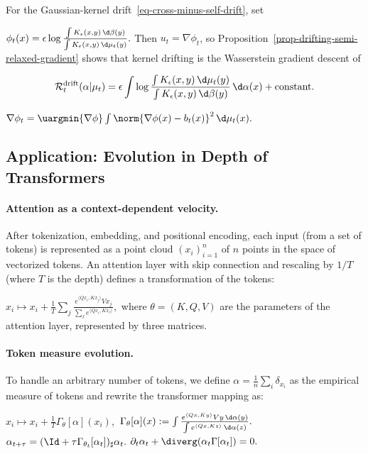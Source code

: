 \begin{example}
For the Gaussian-kernel drift~\eqref{eq-cross-minus-self-drift}, set

\(\phi_t(x)= \epsilon\log \frac{\int K_\epsilon(x,y)\,\d\beta(y)} {\int K_\epsilon(x,y)\,\d\mu_t(y)}.\)
Then $u_t=\nabla\phi_t$, so Proposition~\ref{prop-drifting-semi-relaxed-gradient} shows that kernel drifting is the Wasserstein gradient descent of

\[
\mathcal R_t^{\mathrm{drift}}(\alpha|\mu_t)
=
\epsilon
\int
\log
\frac{\int K_\epsilon(x,y)\,\d\mu_t(y)}
{\int K_\epsilon(x,y)\,\d\beta(y)}
\,\d\alpha(x)
+\mathrm{constant}.
\]
\end{example}
\begin{rem}
\(\nabla\phi_t = \uargmin{\nabla\phi} \int \norm{\nabla\phi(x)-b_t(x)}^2\,\d\mu_t(x).\)
\end{rem}
\subsection{Application: Evolution in Depth of Transformers}
\paragraph{Attention as a context-dependent velocity.}
After tokenization, embedding, and positional encoding, each input (from a set of tokens) is represented as a point cloud $(x_i)_{i=1}^n$ of $n$ points in the space of vectorized tokens. An attention layer with skip connection and rescaling by $1/T$ (where $T$ is the depth) defines a transformation of the tokens:

\(x_i \mapsto x_i + \frac{1}{T} \sum_j \frac{e^{\langle Q x_i, K x_j \rangle} V x_j}{\sum_{\ell} e^{\langle Q x_i, K x_\ell \rangle}},\)
where $\theta = (K, Q, V)$ are the parameters of the attention layer, represented by three matrices.

\paragraph{Token measure evolution.}
To handle an arbitrary number of tokens, we define $\alpha = \frac{1}{n} \sum_i \delta_{x_i}$ as the empirical measure of tokens and rewrite the transformer mapping as:

\(x_i \mapsto x_i + \frac{1}{T} \Gamma_\theta[\alpha](x_i),\)
\(\Gamma_\theta[\alpha](x):= \int \frac{e^{\langle Q x, K y \rangle} V y \, \d \alpha(y)}{\int e^{\langle Q x, K z \rangle} \, \d \alpha(z)}.\)
\(\alpha_{t+\tau} = (\Id + \tau \Gamma_{\theta_t}[\alpha_t])_\sharp \alpha_t.\)
\(\partial_t \alpha_t + \diverg(\alpha_t \Gamma[\alpha_t]) = 0.\)
